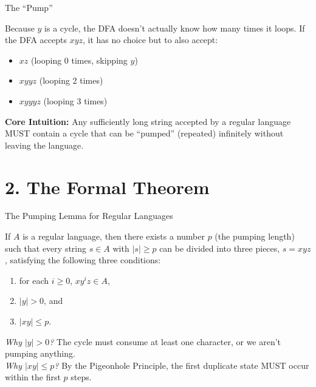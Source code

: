 \documentclass[10pt,aspectratio=169]{beamer}
\begin{document}
\begin{frame}{The ``Pump''}

Because $y$ is a cycle, the DFA doesn't actually know how many times it loops. 
If the DFA accepts $xyz$, it has no choice but to also accept:

\vspace{0.5em}
\begin{itemize}
    \item $xz$ (looping 0 times, skipping $y$)
    \item $xyyz$ (looping 2 times)
    \item $xyyyz$ (looping 3 times)
\end{itemize}

\vspace{0.8em}
\textbf{Core Intuition:} Any sufficiently long string accepted by a regular language MUST contain a cycle that can be ``pumped'' (repeated) infinitely without leaving the language.

\end{frame}

\section{2. The Formal Theorem}

\begin{frame}{The Pumping Lemma for Regular Languages}

\begin{block}{}
If $A$ is a regular language, then there exists a number $p$ (the pumping length) such that every string $s \in A$ with $|s| \geq p$ can be divided into three pieces, $s = xyz$, satisfying the following three conditions:
\vspace{0.5em}
\begin{enumerate}
    \item for each $i \geq 0$, $xy^iz \in A$,
    \item $|y| > 0$, and
    \item $|xy| \leq p$.
\end{enumerate}
\end{block}

\vspace{0.8em}
\textit{Why $|y| > 0$?} The cycle must consume at least one character, or we aren't pumping anything. \\
\textit{Why $|xy| \leq p$?} By the Pigeonhole Principle, the first duplicate state MUST occur within the first $p$ steps. 

\end{frame}
\end{document}
